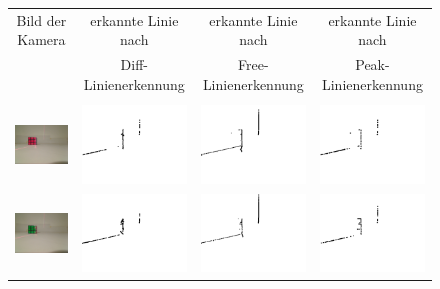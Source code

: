 \documentclass[ngerman,a4paper,parskip=half]{scrartcl}
\begin{document}
\begin{figure}[H]
	\centering
	\begin{tabular}{c|c|c|c}
		Bild der Kamera & erkannte Linie nach & erkannte Linie nach  & erkannte Linie nach \\
		& Diff-Linienerkennung & Free-Linienerkennung & Peak-Linienerkennung \\
		\hline
		& & \\
		
		\includegraphics[width=.22\textwidth]{includes/red_0.png} & 
		\includegraphics[width=.22\textwidth]{includes/red_0_diff.png} &
		\includegraphics[width=.22\textwidth]{includes/red_0_free.png} &
		\includegraphics[width=.22\textwidth]{includes/red_0_peak.png} \\
		
		\includegraphics[width=.22\textwidth]{includes/green_0.png} &
		\includegraphics[width=.22\textwidth]{includes/green_0_diff.png} &
		\includegraphics[width=.22\textwidth]{includes/green_0_free.png} &
		\includegraphics[width=.22\textwidth]{includes/green_0_peak.png} \\
		

\end{tabular}
\end{figure}
\end{document}
